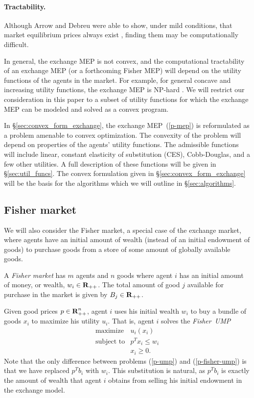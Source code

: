 \documentclass[12pt]{article}
\begin{document}
\paragraph{Tractability.}

Although Arrow and Debreu were able to show, under mild conditions, that market
equilibrium prices always exist \cite{arrow1954existence}, finding them may
be computationally difficult.

In general, the exchange MEP is not convex, and the computational
tractability of an exchange MEP (or a forthcoming Fisher MEP) will depend on
the utility functions of the agents in the market. For example, for general
concave and increasing utility functions, the exchange MEP is NP-hard
\cite{codenotti2006leontief}. We will restrict our consideration in this paper
to a subset of utility functions for which the exchange MEP can be modeled and
solved as a convex program.

In \S\ref{sec:convex_form_exchange}, the exchange MEP~(\ref{p-mep}) is
reformulated as a problem amenable to convex optimization. The convexity of the
problem will depend on properties of the agents' utility functions. The
admissible functions will include linear, constant elasticity of substitution
(CES), Cobb-Douglas, and a few other utilities. A full description of these
functions will be given in \S\ref{sec:util_funcs}. The convex formulation given
in \S\ref{sec:convex_form_exchange} will be the basis for the algorithms which
we will outline in \S\ref{sec:algorithms}.


\subsection{Fisher market}

We will also consider the Fisher market, a special case of the exchange market,
where agents have an initial amount of wealth (instead of an initial endowment
of goods) to purchase goods from a store of some amount of globally available
goods.

A \emph{Fisher market} has $m$ agents and $n$ goods where agent $i$ has an
initial amount of money, or wealth, $w_i \in {\mbox{\bf R}}_{++}$. The total amount of
good $j$ available for purchase in the market is given by $B_j \in
{\mbox{\bf R}}_{++}$.

Given good prices $p \in {\mbox{\bf R}}^n_{++}$, agent $i$ uses his initial wealth
$w_i$ to buy a bundle of goods $x_i$ to maximize his utility $u_i$. That is,
agent $i$ solves the \emph{Fisher~UMP}
\begin{equation}
\label{p-fisher-ump}
\begin{array}{ll}
\mbox{maximize} & u_i(x_i) \\
\mbox{subject to} & p^T x_i \leq w_i \\
& x_i \geq 0.
\end{array}
\end{equation}
Note that the only difference between problems (\ref{p-ump}) and
(\ref{p-fisher-ump}) is that we have replaced $p^T b_i$ with $w_i$.
This substitution is natural, as $p^T b_i$ is exactly the amount
of wealth that agent $i$ obtains from selling his initial endowment
in the exchange model.
\end{document}
